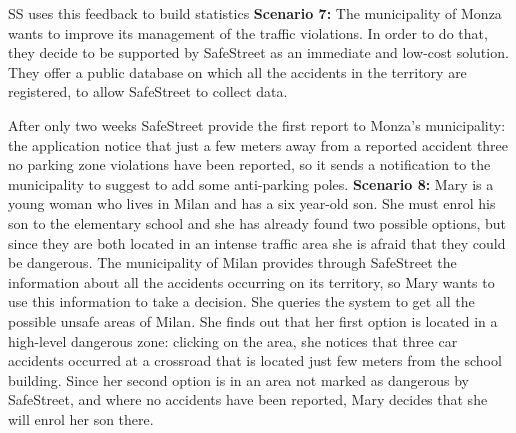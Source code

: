 \documentclass[../RASD.tex]{subfiles}
\begin{document}
                SS uses this feedback to build statistics
    \newline
    \newline
                \textbf{Scenario 7:} The municipality of Monza wants to improve its management of the traffic violations. In order to do that, they decide to be supported by SafeStreet as an immediate and low-cost solution. They offer a public database on which all the accidents in the territory are registered, to allow SafeStreet to collect data.

                After only two weeks SafeStreet provide the first report to Monza’s municipality: the application notice that just a few meters away from a reported accident three no parking zone violations have been reported, so it sends a notification to the municipality to suggest to add some anti-parking poles.
    \newline
    \newline
                \textbf{Scenario 8:} Mary is a young woman who lives in Milan and has a six year-old son. She must enrol his son to the elementary school and she has already found two possible options, but since they are both located in an intense traffic area she is afraid that they could be dangerous. The municipality of Milan provides through SafeStreet the information about all the accidents occurring on its territory, so Mary wants to use this information to take a decision.
                She queries the system to get all the possible unsafe areas of Milan. She finds out that her first option is located in a high-level dangerous zone: clicking on the area, she notices that three car accidents occurred at a crossroad that is located just few meters from the school building. Since her second option is in an area not marked as dangerous by SafeStreet, and where no accidents have been reported, Mary decides that she will enrol her son there.
\end{document}
